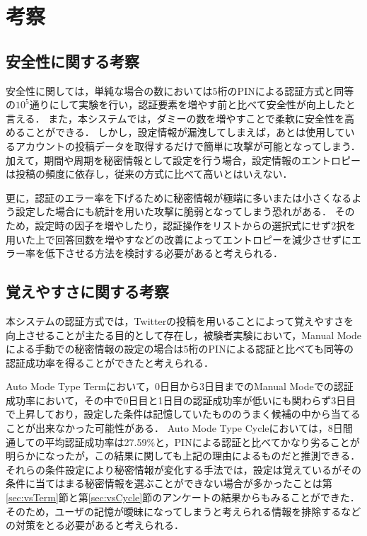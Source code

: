 \chapter{考察}\label{chap:discussion}
\section{安全性に関する考察}\label{sec:safety}
安全性に関しては，単純な場合の数においては5桁のPINによる認証方式と同等の$ 10 ^ 5 $通りにして実験を行い，認証要素を増やす前と比べて安全性が向上したと言える．
また，本システムでは，ダミーの数を増やすことで柔軟に安全性を高めることができる．
しかし，設定情報が漏洩してしまえば，あとは使用しているアカウントの投稿データを取得するだけで簡単に攻撃が可能となってしまう．
加えて，期間や周期を秘密情報として設定を行う場合，設定情報のエントロピーは投稿の頻度に依存し，従来の方式に比べて高いとはいえない．

更に，認証のエラー率を下げるために秘密情報が極端に多いまたは小さくなるよう設定した場合にも統計を用いた攻撃に脆弱となってしまう恐れがある．
そのため，設定時の因子を増やしたり，認証操作をリストからの選択式にせず2択を用いた上で回答回数を増やすなどの改善によってエントロピーを減少させず\cite{kaneko:2013-01-22}にエラー率を低下させる方法を検討する必要があると考えられる．

\section{覚えやすさに関する考察}\label{sec:memorable}
本システムの認証方式では，Twitterの投稿を用いることによって覚えやすさを向上させることが主たる目的として存在し，被験者実験において，Manual Modeによる手動での秘密情報の設定の場合は5桁のPINによる認証と比べても同等の認証成功率を得ることができたと考えられる．

Auto Mode Type Termにおいて，0日目から3日目までのManual Modeでの認証成功率において，その中で0日目と1日目の認証成功率が低いにも関わらず3日目で上昇しており，設定した条件は記憶していたもののうまく候補の中から当てることが出来なかった可能性がある．
Auto Mode Type Cycleにおいては，8日間通しての平均認証成功率は27.59\%と，PINによる認証と比べてかなり劣ることが明らかになったが，この結果に関しても上記の理由によるものだと推測できる．
それらの条件設定により秘密情報が変化する手法では，設定は覚えているがその条件に当てはまる秘密情報を選ぶことができない場合が多かったことは第\ref{sec:vsTerm}節と第\ref{sec:vsCycle}節のアンケートの結果からもみることができた．
そのため，ユーザの記憶が曖昧になってしまうと考えられる情報を排除するなどの対策をとる必要があると考えられる．

